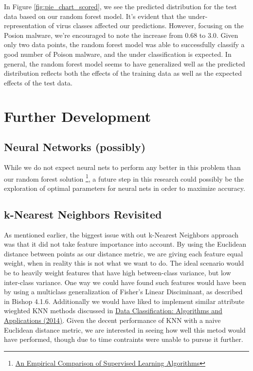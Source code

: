 \documentclass[letterpaper]{article}
\begin{document}
\noindent In Figure \ref{fig:pie_chart_scored}, we see the predicted distribution for the test data based on our random forest model. It's evident that the under-representation of virus classes affected our predictions. However, focusing on the Posion malware, we're encouraged to note the increase from $0.68$ to $3.0$. Given only two data points, the random forest model was able to successfully classify a good number of Poison malware, and the under classification is expected. In general, the random forest model seems to have generalized well as the predicted distribution reflects both the effects of the training data as well as the expected effects of the test data.

\section{Further Development}
\subsection{Neural Networks (possibly)}
\noindent While we do not expect neural nets to perform any better in this problem than our random forest solution \footnote{\href{http://www.cs.cornell.edu/~caruana/ctp/ct.papers/caruana.icml06.pdf}{An Empirical Comparison of Supervised Learning Algorithms}}, a future step in this research could possibly be the exploration of optimal parameters for neural nets in order to maximize accuracy. 

\subsection{k-Nearest Neighbors Revisited}
As mentioned earlier, the biggest issue with out k-Nearest Neighbors approach was that it did not take feature importance into account. By using the Euclidean distance between points as our distance metric, we are giving each feature equal weight, when in reality this is not what we want to do. The ideal scenario would be to heavily weight features that have high between-class variance, but low inter-class variance. One way we could have found such features would have been by using a multiclass generalization of Fisher's Linear Disciminant, as described in Bishop 4.1.6. Additionally we would have liked to implement similar attribute wieghted KNN methods discussed in \href{https://books.google.com/books?id=qm_SBQAAQBAJ&pg=PA165&lpg=PA165&dq=classification+find+features+with+low+intra+class+variance+high+inter+class+variance&source=bl&ots=CRE2ln-JwE&sig=wViY6RYVFFhI4gx8Ai8p939FFn0&hl=en&sa=X&ei=esj4VMjNDMflsATBqYG4CA&ved=0CCAQ6AEwAA#v=onepage&q=classification\%20find\%20features\%20with\%20low\%20intra\%20class\%20variance\%20high\%20inter\%20class\%20variance&f=false}{Data Classification: Algorithms and Applications (2014)}. Given the decent performance of KNN with a naive Euclidean distance metric, we are interested in seeing how well this metod would have performed, though due to time contraints were unable to pursue it further.
\end{document}
